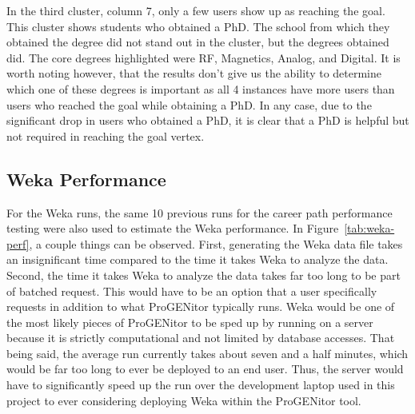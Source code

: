 In the third cluster, column 7, only a few users show up as reaching the goal. 
This cluster shows students who obtained a PhD.  The school from which they
obtained the degree did not stand out in the cluster, but the degrees obtained
did.  The core degrees highlighted were RF, Magnetics, Analog, and Digital.  It
is worth noting however, that the results don't give us the ability to determine
which one of these degrees is important as all 4 instances have more users than
users who reached the goal while obtaining a PhD.  In any case, due to the
significant drop in users who obtained a PhD, it is clear that a PhD is helpful
but not required in reaching the goal vertex.

\subsection{Weka Performance}
For the Weka runs, the same 10 previous runs for the career path performance
testing were also used to estimate the Weka performance.  In
Figure~\ref{tab:weka-perf}, a couple things can be observed.  First, generating
the Weka data file takes an insignificant time compared to the time it takes
Weka to analyze the data.  Second, the time it takes Weka to analyze the data
takes far too long to be part of batched request.  This would have to be an
option that a user specifically requests in addition to what ProGENitor
typically runs.  Weka would be one of the most likely pieces of ProGENitor to be
sped up by running on a server because it is strictly computational and not
limited by database accesses.  That being said, the average run currently takes
about seven and a half minutes, which would be far too long to ever be deployed to an end user.
Thus, the server would have to significantly speed up the run over the
development laptop used in this project to ever considering deploying Weka
within the ProGENitor tool.

